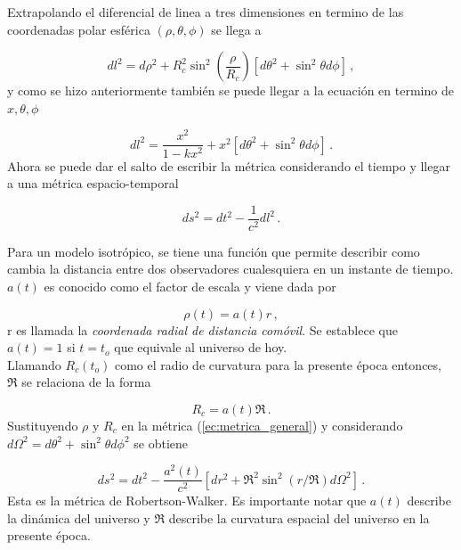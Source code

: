 
Extrapolando el diferencial de linea a tres dimensiones en termino de las coordenadas polar esférica $(\rho, \theta, \phi)$ se llega a 

\begin{equation}
dl^{2}=d\rho^{2}+R^{2}_{c}\sin^{2}\left(\frac{\rho}{R_{c}}\right)[d\theta^{2}+\sin^{2}\theta d\phi]\,,
\end{equation}
%
y como se hizo anteriormente también se puede llegar a la ecuación en termino de $x, \theta, \phi$

\begin{equation}
dl^{2}=\frac{x^{2}}{1-kx^{2}}+ x^{2}[d\theta^{2}+\sin^{2}\theta d\phi]\,.
\end{equation}
%
Ahora se puede dar el salto de escribir la métrica considerando el tiempo y llegar a una métrica espacio-temporal

\begin{equation}
ds^{2}=dt^{2}-\frac{1}{c^{2}}dl^{2}\,.
\label{ec:metrica_general}
\end{equation}

Para un modelo isotrópico, se tiene una función que permite describir como cambia la distancia entre dos observadores cualesquiera en un instante de tiempo. $a(t)$ es conocido como el factor de escala y viene dada por 

\begin{equation}
\rho(t)=a(t)r\,,
\end{equation} 
%
r es llamada la \textit{ coordenada radial de distancia comóvil}. Se establece que $a(t)=1$ si $t=t_{o}$ que equivale al universo de hoy.\\

Llamando $R_{c}(t_o)$ como el radio de curvatura para la presente época entonces, $\Re$ se relaciona de la forma

\begin{equation}
R_{c}=a(t)\Re \,.
\end{equation}
%
Sustituyendo $\rho$ y $R_{c}$ en la métrica (\ref{ec:metrica_general}) y considerando $d\Omega^{2}=d\theta^{2}+\sin^{2}\theta d\phi^{2}$ se obtiene 

\begin{equation}
ds^{2}=dt^{2}-\frac{a^{2}(t)}{c^{2}}[dr^{2}+\Re^{2}\sin^{2}(r/\Re)d\Omega^{2}]\,.
\end{equation}
%
Esta es la métrica de Robertson-Walker. Es importante notar que $a(t)$ describe la dinámica del universo y $\Re$ describe la curvatura espacial del universo en la presente época.

